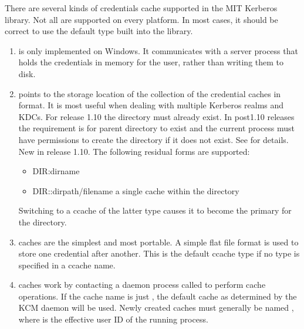 \documentclass[letterpaper,10pt,english]{sphinxmanual}
\begin{document}
\sphinxAtStartPar
There are several kinds of credentials cache supported in the MIT
Kerberos library.  Not all are supported on every platform.  In most
cases, it should be correct to use the default type built into the
library.
\begin{enumerate}
%
\item {} 
\sphinxAtStartPar
{} is only implemented on Windows.  It communicates with a
server process that holds the credentials in memory for the user,
rather than writing them to disk.

\item {} 
\sphinxAtStartPar
{} points to the storage location of the collection of the
credential caches in  format. It is most useful when dealing
with multiple Kerberos realms and KDCs.  For release 1.10 the
directory must already exist.  In post\sphinxhyphen{}1.10 releases the
requirement is for parent directory to exist and the current
process must have permissions to create the directory if it does
not exist. See {\hyperref[\detokenize{basic/ccache_def:col-ccache}]{}} for details.  New in release 1.10.
The following residual forms are supported:
\begin{itemize}
\item {} 
\sphinxAtStartPar
DIR:dirname

\item {} 
\sphinxAtStartPar
DIR::dirpath/filename \sphinxhyphen{} a single cache within the directory

\end{itemize}

\sphinxAtStartPar
Switching to a ccache of the latter type causes it to become the
primary for the directory.

\item {} 
\sphinxAtStartPar
{} caches are the simplest and most portable. A simple flat
file format is used to store one credential after another.  This is
the default ccache type if no type is specified in a ccache name.

\item {} 
\sphinxAtStartPar
{} caches work by contacting a daemon process called 
to perform cache operations.  If the cache name is just ,
the default cache as determined by the KCM daemon will be used.
Newly created caches must generally be named ,
where  is the effective user ID of the running process.


\end{enumerate}
\end{document}

